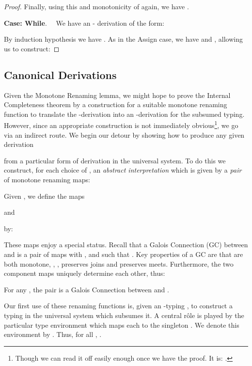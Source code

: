 \documentclass{sigplanconf}
\newcommand{\proofcase}[2][Case]{\noindent  
 \raisebox{2ex}{\mbox{}} \textbf{#1: #2}.~~}
\begin{document}
\begin{table}
\begin{proof}
Finally, using this and monotonicity of  again, we have
.

\proofcase{While}
We have an - derivation of the form:

By induction hypothesis we have .
As in the Assign case, we have 
and , allowing us to construct:


\end{proof}

\subsection{Canonical Derivations}
Given the Monotone Renaming lemma, we might hope to prove the
Internal Completeness theorem by a construction for a suitable
monotone renaming function to translate the -derivation
into an -derivation for the subsumed typing. However,
since an appropriate construction is not immediately obvious\footnote{Though we can read it off easily enough once we have the proof. It is:
.}, we go via an indirect route.
We begin our detour by showing how to produce any given derivation

from a particular form of 
derivation in the universal system. To do this
we construct, for each choice of , an \emph{abstract interpretation} 
 \cite{Cousot:Cousot:Abstract:Interpretation} which is given by 
a \emph{pair} of monotone renaming maps:
\begin{definition}
Given , we define the maps

and

by:

\end{definition}
These maps enjoy a special status.
Recall \cite{davey90introduction}
that a Galois Connection (GC) between  and 
is a pair of maps  with
,
 and such that
.
Key properties of a GC are that  are both monotone,
,
,
 preserves joins and  preserves meets.
Furthermore, the two component maps uniquely determine each other, thus:

\begin{lemma}
        For any , the pair
         is a Galois Connection between  and .
\end{lemma}
Our first use of these renaming functions is, given
an -typing , to construct a 
typing in the universal system
which subsumes it.
A central r\^{o}le is played by the particular  type environment
which maps each  to the singleton .
We denote this environment by .
Thus, for all
,
.
\begin{lemma}\label{lemma:shift}
    

\end{lemma}
\end{table}
\end{document}
